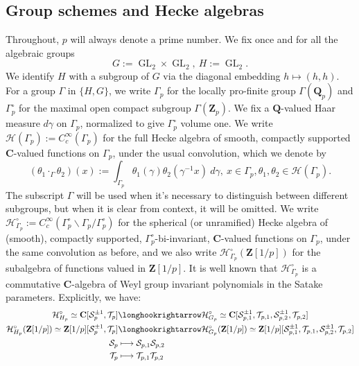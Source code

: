 \documentclass{amsart}%
\theoremstyle{plain}
\theoremstyle{plain}
\theoremstyle{remark}
\DeclareMathOperator{\GL}{GL}
\begin{document}
\subsection{Group schemes and Hecke algebras}
Throughout, $p$ will always denote a prime number. We fix once and for all the algebraic groups $$G:=\GL_2\times \GL_2,\  H:=\GL_2.$$
We identify $H$ with a subgroup of $G$ via the diagonal embedding $h\mapsto (h,h)$. 
  For a group $\Gamma$ in $\{H,G\}$, we write $\Gamma_p$ for the locally pro-finite group $\Gamma(\mathbf{Q}_p)$ and $\Gamma_p^\circ$ for the maximal open compact subgroup  $\Gamma(\mathbf{Z}_p)$. We fix a $\mathbf{Q}$-valued Haar measure $d\gamma$ on $\Gamma_p$, normalized to give $\Gamma_p^\circ$ volume one. We write $\mathcal{H}(\Gamma_p):=C_c^\infty(\Gamma_p)$ for the full Hecke algebra of smooth, compactly supported $\mathbf{C}$-valued functions on $\Gamma_p$, under the usual convolution, which we denote by $$(\theta_1\cdot_\Gamma \theta_2)(x):=\int_{\Gamma_p} \theta_1(\gamma)\theta_2(\gamma^{-1}x)\ d\gamma, \ x\in\Gamma_p, \theta_1,\theta_2\in\mathcal{H}(\Gamma_p).$$ The subscript $\Gamma$ will be used when it's necessary to distinguish between different subgroups, but when it is clear from context, it will be omitted. We write $\mathcal{H}_{\Gamma_p}^\circ:=C_c^\infty(\Gamma_p^\circ\backslash \Gamma_p/\Gamma_p^\circ)$ for the spherical (or unramified) Hecke algebra of (smooth), compactly supported, $\Gamma_p^\circ$-bi-invariant, $\mathbf{C}$-valued functions on $\Gamma_p$, under the same convolution as before, and we also write $\mathcal{H}_{\Gamma_p}^\circ(\mathbf{Z}[1/p])$ for the subalgebra of functions valued in $\mathbf{Z}[1/p]$. It is well known that $\mathcal{H}_{\Gamma_p}^\circ$ is a commutative $\mathbf{C}$-algebra of Weyl group invariant polynomials in the Satake parameters. Explicitly, we have:
  \begin{align*}\mathcal{H}_{H_p}^\circ\simeq\mathbf{C}[\mathcal{S}_p^{\pm 1},\mathcal{T}_p]&\longhookrightarrow\mathcal{H}_{G_p}^\circ\simeq\mathbf{C}[\mathcal{S}_{p,1}^{\pm1},\mathcal{T}_{p,1},\mathcal{S}_{p,2}^{\pm 1},\mathcal{T}_{p,2}]\\
\mathcal{H}_{H_p}^\circ(\mathbf{Z}[1/p])\simeq\mathbf{Z}[1/p][\mathcal{S}_p^{\pm 1},\mathcal{T}_p]&\longhookrightarrow\mathcal{H}_{G_p}^\circ(\mathbf{Z}[1/p])\simeq\mathbf{Z}[1/p][\mathcal{S}_{p,1}^{\pm1},\mathcal{T}_{p,1},\mathcal{S}_{p,2}^{\pm 1},\mathcal{T}_{p,2}]\\
\mathcal{S}_p& \longmapsto \mathcal{S}_{p,1}\mathcal{S}_{p,2}\\
\mathcal{T}_{p}&\longmapsto\mathcal{T}_{p,1}\mathcal{T}_{p,2}\end{align*}
\end{document}
